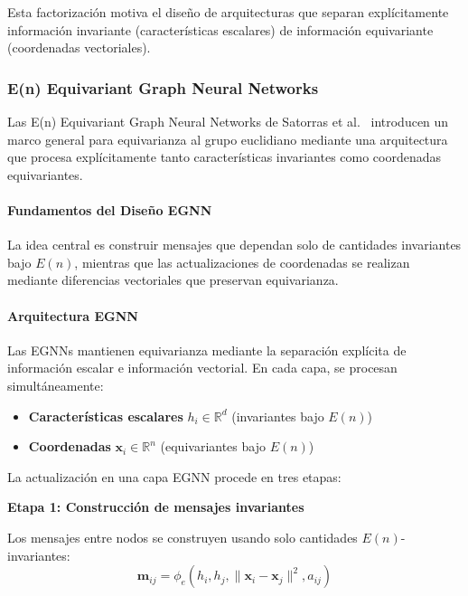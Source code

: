 Esta factorización motiva el diseño de arquitecturas que separan explícitamente información invariante (características escalares) de información equivariante (coordenadas vectoriales).

\subsubsection{E(n) Equivariant Graph Neural Networks}

Las E(n) Equivariant Graph Neural Networks de Satorras et al.~\citep{satorras2021enequivariant} introducen un marco general para equivarianza al grupo euclidiano mediante una arquitectura que procesa explícitamente tanto características invariantes como coordenadas equivariantes.

\paragraph{Fundamentos del Diseño EGNN}

La idea central es construir mensajes que dependan solo de cantidades invariantes bajo $E(n)$, mientras que las actualizaciones de coordenadas se realizan mediante diferencias vectoriales que preservan equivarianza.

\paragraph{Arquitectura EGNN}

Las EGNNs mantienen equivarianza mediante la separación explícita de información escalar e información vectorial. En cada capa, se procesan simultáneamente:
\begin{itemize}
    \item \textbf{Características escalares} $h_i \in \mathbb{R}^d$ (invariantes bajo $E(n)$)
    \item \textbf{Coordenadas} $\mathbf{x}_i \in \mathbb{R}^n$ (equivariantes bajo $E(n)$)
\end{itemize}

La actualización en una capa EGNN procede en tres etapas:

\textbf{Etapa 1: Construcción de mensajes invariantes}

Los mensajes entre nodos se construyen usando solo cantidades $E(n)$-invariantes:
\begin{equation}\label{eq:egnn_message}
\mathbf{m}_{ij} = \phi_e(h_i, h_j, \|\mathbf{x}_i - \mathbf{x}_j\|^2, a_{ij})
\end{equation}

